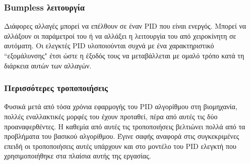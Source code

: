 \subsubsection{Bumpless λειτουργία}
Διάφορες αλλαγές μπορεί να επέλθουν σε έναν PID που είναι ενεργός. Μπορεί να αλλάξουν οι παράμετροί του ή να αλλάξει η λειτουργία του από χειροκίνητη σε αυτόματη. Οι ελεγκτές PID υλοποιούνται συχνά με ένα χαρακτηριστικό ``εξομάλυνσης" έτσι ώστε η έξοδός τους να μεταβάλλεται με ομαλό τρόπο κατά τη διάρκεια αυτών των αλλαγών.%

\subsubsection{Περισσότερες τροποποιήσεις}
Φυσικά μετά από τόσα χρόνια εφαρμογής του PID αλγορίθμου στη βιομηχανία, πολλές εναλλακτικές μορφές του έχουν προταθεί, πέρα από αυτές τις δύο προαναφερθέντες. Η καθεμία από αυτές τις τροποποιήσεις βελτιώνει πολλά από τα προβλήματα του βασικού αλγορίθμου. Έγινε σαφής αναφορά στις συγκεκριμένες επειδή οι τροποποιήσεις αυτές υπάρχουν και στο μοντέλο του PID ελεγκτή που χρησιμοποιήθηκε στα πλαίσια αυτής της εργασίας.

%



